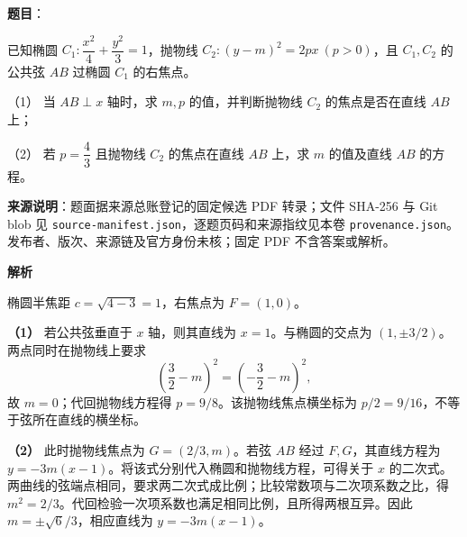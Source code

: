 \begin{answer}

\textbf{题目}：

已知椭圆 $C_1:\dfrac{x^2}{4}+\dfrac{y^2}{3}=1$，抛物线 $C_2:(y-m)^2=2px\ (p>0)$，且 $C_1,C_2$ 的公共弦 $AB$ 过椭圆 $C_1$ 的右焦点。

（1） 当 $AB\perp x$ 轴时，求 $m,p$ 的值，并判断抛物线 $C_2$ 的焦点是否在直线 $AB$ 上；

（2） 若 $p=\dfrac43$ 且抛物线 $C_2$ 的焦点在直线 $AB$ 上，求 $m$ 的值及直线 $AB$ 的方程。

\par\medskip

\begin{gktip}
\textbf{来源说明}：题面据来源总账登记的固定候选 PDF 转录；文件 SHA-256 与 Git blob 见 \texttt{source-manifest.json}，逐题页码和来源指纹见本卷 \texttt{provenance.json}。发布者、版次、来源链及官方身份未核；固定 PDF 不含答案或解析。
\end{gktip}

\textbf{解析}

椭圆半焦距 $c=\sqrt{4-3}=1$，右焦点为 $F=(1,0)$。

\textbf{（1）} 若公共弦垂直于 $x$ 轴，则其直线为 $x=1$。与椭圆的交点为 $(1,\pm3/2)$。两点同时在抛物线上要求
\nopagebreak[4]
\[
\left(\frac32-m\right)^2=\left(-\frac32-m\right)^2,
\]
故 $m=0$；代回抛物线方程得 $p=9/8$。该抛物线焦点横坐标为 $p/2=9/16$，不等于弦所在直线的横坐标。

\textbf{（2）} 此时抛物线焦点为 $G=(2/3,m)$。若弦 $AB$ 经过 $F,G$，其直线方程为 $y=-3m(x-1)$。将该式分别代入椭圆和抛物线方程，可得关于 $x$ 的二次式。两曲线的弦端点相同，要求两二次式成比例；比较常数项与二次项系数之比，得 $m^2=2/3$。代回检验一次项系数也满足相同比例，且所得两根互异。因此 $m=\pm\sqrt6/3$，相应直线为 $y=-3m(x-1)$。



\end{answer}